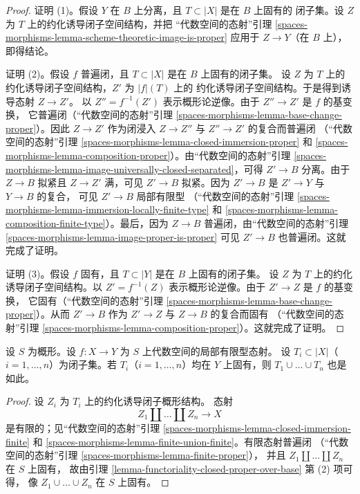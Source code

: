\begin{proof}
证明 (1)。假设 $Y$ 在 $B$ 上分离，且 $T \subset |X|$ 是在 $B$ 上固有的
闭子集。设 $Z$ 为 $T$ 上的约化诱导闭子空间结构，并把
“代数空间的态射”引理
\ref{spaces-morphisms-lemma-scheme-theoretic-image-is-proper}
应用于 $Z \to Y$（在 $B$ 上），即得结论。

\medskip\noindent
证明 (2)。假设 $f$ 普遍闭，且 $T \subset |X|$ 是在 $B$ 上固有的闭子集。
设 $Z$ 为 $T$ 上的约化诱导闭子空间结构，$Z'$ 为 $|f|(T)$ 上的
约化诱导闭子空间结构。于是得到诱导态射 $Z \to Z'$。
以 $Z'' = f^{-1}(Z')$ 表示概形论逆像。由于 $Z'' \to Z'$ 是 $f$ 的基变换，
它普遍闭（“代数空间的态射”引理
\ref{spaces-morphisms-lemma-base-change-proper}）。因此 $Z \to Z'$ 作为闭浸入
$Z \to Z''$ 与 $Z'' \to Z'$ 的复合而普遍闭
（“代数空间的态射”引理
\ref{spaces-morphisms-lemma-closed-immersion-proper} 和
\ref{spaces-morphisms-lemma-composition-proper}）。由“代数空间的态射”引理
\ref{spaces-morphisms-lemma-image-universally-closed-separated}，可得
$Z' \to B$ 分离。由于 $Z \to B$ 拟紧且 $Z \to Z'$ 满，可见
$Z' \to B$ 拟紧。因为 $Z' \to B$ 是 $Z' \to Y$ 与 $Y \to B$ 的复合，
可见 $Z' \to B$ 局部有限型
（“代数空间的态射”引理
\ref{spaces-morphisms-lemma-immersion-locally-finite-type} 和
\ref{spaces-morphisms-lemma-composition-finite-type}）。最后，因为
$Z \to B$ 普遍闭，由“代数空间的态射”引理
\ref{spaces-morphisms-lemma-image-proper-is-proper} 可见
$Z' \to B$ 也普遍闭。这就完成了证明。

\medskip\noindent
证明 (3)。假设 $f$ 固有，且 $T \subset |Y|$ 是在 $B$ 上固有的闭子集。
设 $Z$ 为 $T$ 上的约化诱导闭子空间结构。以
$Z' = f^{-1}(Z)$ 表示概形论逆像。由于 $Z' \to Z$ 是 $f$ 的基变换，
它固有（“代数空间的态射”引理
\ref{spaces-morphisms-lemma-base-change-proper}）。从而 $Z' \to B$ 作为
$Z' \to Z$ 与 $Z \to B$ 的复合而固有
（“代数空间的态射”引理
\ref{spaces-morphisms-lemma-composition-proper}）。这就完成了证明。
\end{proof}

\begin{lemma}
\label{lemma-union-closed-proper-over-base}
设 $S$ 为概形。设 $f : X \to Y$ 为 $S$ 上代数空间的局部有限型态射。
设 $T_i \subset |X|$（$i = 1, \ldots, n$）为闭子集。若
$T_i$（$i = 1, \ldots, n$）均在 $Y$ 上固有，则
$T_1 \cup \ldots \cup T_n$ 也是如此。
\end{lemma}

\begin{proof}
设 $Z_i$ 为 $T_i$ 上的约化诱导闭子概形结构。 %
态射
$$
Z_1 \amalg \ldots \amalg Z_n \longrightarrow X
$$
是有限的；见“代数空间的态射”引理
\ref{spaces-morphisms-lemma-closed-immersion-finite} 和
\ref{spaces-morphisms-lemma-finite-union-finite}。有限态射普遍闭
（“代数空间的态射”引理 \ref{spaces-morphisms-lemma-finite-proper}），
并且 $Z_1 \amalg \ldots \amalg Z_n$ 在 $S$ 上固有， %
故由引理 \ref{lemma-functoriality-closed-proper-over-base} 第 (2) 项可得，
像 $Z_1 \cup \ldots \cup Z_n$ 在 $S$ 上固有。
\end{proof}

